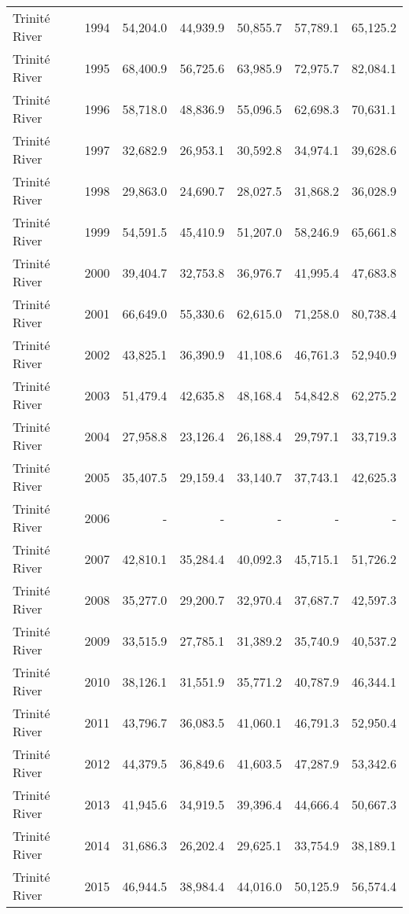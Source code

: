 \begin{longtable}{llrrrrr}
  Trinité River & 1994 & 54,204.0 & 44,939.9 & 50,855.7 & 57,789.1 & 65,125.2 \\ 
  Trinité River & 1995 & 68,400.9 & 56,725.6 & 63,985.9 & 72,975.7 & 82,084.1 \\ 
  Trinité River & 1996 & 58,718.0 & 48,836.9 & 55,096.5 & 62,698.3 & 70,631.1 \\ 
  Trinité River & 1997 & 32,682.9 & 26,953.1 & 30,592.8 & 34,974.1 & 39,628.6 \\ 
  Trinité River & 1998 & 29,863.0 & 24,690.7 & 28,027.5 & 31,868.2 & 36,028.9 \\ 
  Trinité River & 1999 & 54,591.5 & 45,410.9 & 51,207.0 & 58,246.9 & 65,661.8 \\ 
  Trinité River & 2000 & 39,404.7 & 32,753.8 & 36,976.7 & 41,995.4 & 47,683.8 \\ 
  Trinité River & 2001 & 66,649.0 & 55,330.6 & 62,615.0 & 71,258.0 & 80,738.4 \\ 
  Trinité River & 2002 & 43,825.1 & 36,390.9 & 41,108.6 & 46,761.3 & 52,940.9 \\ 
  Trinité River & 2003 & 51,479.4 & 42,635.8 & 48,168.4 & 54,842.8 & 62,275.2 \\ 
  Trinité River & 2004 & 27,958.8 & 23,126.4 & 26,188.4 & 29,797.1 & 33,719.3 \\ 
  Trinité River & 2005 & 35,407.5 & 29,159.4 & 33,140.7 & 37,743.1 & 42,625.3 \\ 
  Trinité River & 2006 & - & - & - & - & - \\ 
  Trinité River & 2007 & 42,810.1 & 35,284.4 & 40,092.3 & 45,715.1 & 51,726.2 \\ 
  Trinité River & 2008 & 35,277.0 & 29,200.7 & 32,970.4 & 37,687.7 & 42,597.3 \\ 
  Trinité River & 2009 & 33,515.9 & 27,785.1 & 31,389.2 & 35,740.9 & 40,537.2 \\ 
  Trinité River & 2010 & 38,126.1 & 31,551.9 & 35,771.2 & 40,787.9 & 46,344.1 \\ 
  Trinité River & 2011 & 43,796.7 & 36,083.5 & 41,060.1 & 46,791.3 & 52,950.4 \\ 
  Trinité River & 2012 & 44,379.5 & 36,849.6 & 41,603.5 & 47,287.9 & 53,342.6 \\ 
  Trinité River & 2013 & 41,945.6 & 34,919.5 & 39,396.4 & 44,666.4 & 50,667.3 \\ 
  Trinité River & 2014 & 31,686.3 & 26,202.4 & 29,625.1 & 33,754.9 & 38,189.1 \\ 
  Trinité River & 2015 & 46,944.5 & 38,984.4 & 44,016.0 & 50,125.9 & 56,574.4 \\ 

\end{longtable}
